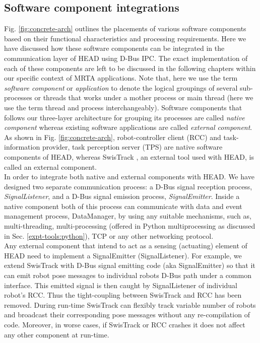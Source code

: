 \subsection{Software component integrations}
Fig. \ref{fig:concrete-arch} outlines the placements of various software components based on their functional characteristics and processing requirements. Here we have discussed how these  software components can be integrated in the communication layer of HEAD using D-Bus IPC. The exact implementation of each of these components are left to be discussed in the following chapters within our specific context of MRTA applications. Note that, here we use the term {\em software component} or {\em application} to denote the logical groupings of several sub-processes or threads that works under a mother process or main thread (here we use the term thread and process interchangeably). Software components that follows our three-layer architecture for grouping its processes are called {\em native component} whereas existing software applications are called {\em external component}. As shown in Fig. \ref{fig:concrete-arch}, robot-controller client (RCC) and task-information provider, task perception server (TPS) are native software components of HEAD, whereas SwisTrack \cite{Lochmatter+2008}, an external tool used with HEAD, is called an external component.\\
In order to integrate both native and external components with HEAD. We have designed two separate communication process: a D-Bus signal reception process, {\em SignalListener}, and a D-Bus signal emission process, {\em SignalEmitter}. Inside a native component both of this process can communicate with data and event management process, DataManager, by using any suitable mechanisms, such as, multi-threading, multi-processing (offered in Python multiprocessing as discussed in Sec. \ref{expt-tools:python}), TCP or any other networking protocol.\\
Any external component that intend to act as a sensing (actuating) element of HEAD need to implement a SignalEmitter (SignalListener). For example, we extend SwisTrack with D-Bus signal emitting code (aka SignalEmitter) so that it can emit robot pose messages to individual robots D-Bus path under a common interface.  This emitted signal is then caught by SignalListener of individual robot's RCC. Thus the tight-coupling between SwisTrack and RCC has been removed. During run-time SwisTrack can flexibly track variable number of robots and broadcast their corresponding pose messages without any re-compilation of code. Moreover, in worse cases, if SwisTrack or RCC crashes it does not affect any other component at run-time.\\
